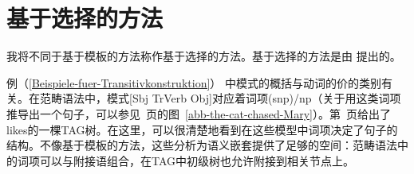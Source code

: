 \section{基于选择的方法}
\label{Abschnitt-Selektionsbasierter-Spracherwerb}

我将不同于基于模板的方法称作基于选择的方法。基于选择的方法是由 \citet{Green-Grammar-Growth}提出的。

例（\ref{Beispiele-fuer-Transitivkonstruktion}） 中模式的概括与动词的价的类别有关。在范畴语法中，模式[Sbj TrVerb Obj]对应着词项(s\bs np)/np（关于用这类词项推导出一个句子，可以参见~\pageref{abb-the-cat-chased-Mary}页的图~\ref{abb-the-cat-chased-Mary}）。第~\pageref{Abbildung-Max-likes-Anouk}页给出了likes的一棵TAG树。在这里，可以很清楚地看到在这些模型中词项决定了句子的结构。不像基于模板的方法，这些分析为语义嵌套提供了足够的空间：范畴语法中的词项可以与附接语组合，在TAG中初级树也允许附接到相关节点上。

